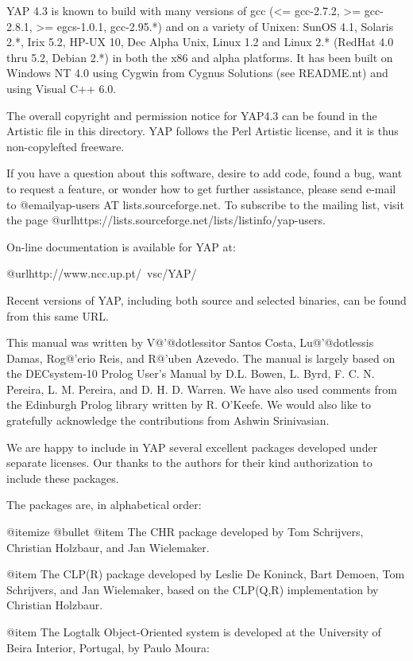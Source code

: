 YAP 4.3 is known to build with many versions of gcc (<= gcc-2.7.2, >=
gcc-2.8.1, >= egcs-1.0.1, gcc-2.95.*) and on a variety of Unixen:
SunOS 4.1, Solaris 2.*, Irix 5.2, HP-UX 10, Dec Alpha Unix, Linux 1.2
and Linux 2.* (RedHat 4.0 thru 5.2, Debian 2.*) in both the x86 and
alpha platforms. It has been built on Windows NT 4.0 using Cygwin from
Cygnus Solutions (see README.nt) and using Visual C++ 6.0.

The overall copyright and permission notice for YAP4.3 can be found in
the Artistic file in this directory. YAP follows the Perl Artistic
license, and it is thus non-copylefted freeware.

If you have a question about this software, desire to add code, found a
bug, want to request a feature, or wonder how to get further assistance,
please send e-mail to @email{yap-users AT lists.sourceforge.net}.  To
subscribe to the mailing list, visit the page
@url{https://lists.sourceforge.net/lists/listinfo/yap-users}.

On-line documentation is available for YAP at:

        @url{http://www.ncc.up.pt/~vsc/YAP/}

Recent versions of YAP, including both source and selected binaries,
can be found from this same URL.

This manual was written by V@'{@dotless{i}}tor Santos Costa,
Lu@'{@dotless{i}}s Damas, Rog@'erio Reis, and R@'uben Azevedo. The
manual is largely based on the DECsystem-10 Prolog User's Manual by
D.L. Bowen, L. Byrd, F. C. N. Pereira, L. M. Pereira, and
D. H. D. Warren. We have also used comments from the Edinburgh Prolog
library written by R. O'Keefe. We would also like to gratefully
acknowledge the contributions from Ashwin Srinivasian.

We are happy to include in YAP several excellent packages developed
under separate licenses. Our thanks to the authors for their kind
authorization to include these packages.

The packages are, in alphabetical order:

@itemize @bullet
@item The CHR package developed by Tom Schrijvers,
Christian Holzbaur, and Jan Wielemaker.

@item The CLP(R) package developed by Leslie De Koninck, Bart Demoen, Tom
Schrijvers, and Jan Wielemaker, based on the CLP(Q,R) implementation
by Christian Holzbaur.

@item The Logtalk Object-Oriented system is developed at the University 
of Beira Interior, Portugal, by Paulo Moura:

